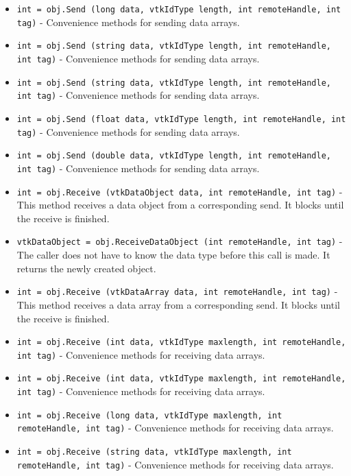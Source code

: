 \begin{itemize}
\item  \verb|int = obj.Send (long data, vtkIdType length, int remoteHandle, int tag)| -  Convenience methods for sending data arrays.

\item  \verb|int = obj.Send (string data, vtkIdType length, int remoteHandle, int tag)| -  Convenience methods for sending data arrays.

\item  \verb|int = obj.Send (string data, vtkIdType length, int remoteHandle, int tag)| -  Convenience methods for sending data arrays.

\item  \verb|int = obj.Send (float data, vtkIdType length, int remoteHandle, int tag)| -  Convenience methods for sending data arrays.

\item  \verb|int = obj.Send (double data, vtkIdType length, int remoteHandle, int tag)| -  Convenience methods for sending data arrays.

\item  \verb|int = obj.Receive (vtkDataObject data, int remoteHandle, int tag)| -  This method receives a data object from a corresponding send. It blocks
 until the receive is finished.

\item  \verb|vtkDataObject = obj.ReceiveDataObject (int remoteHandle, int tag)| -  The caller does not have to know the data type before this call is made.
 It returns the newly created object.

\item  \verb|int = obj.Receive (vtkDataArray data, int remoteHandle, int tag)| -  This method receives a data array from a corresponding send. It blocks
 until the receive is finished.

\item  \verb|int = obj.Receive (int data, vtkIdType maxlength, int remoteHandle, int tag)| -  Convenience methods for receiving data arrays.

\item  \verb|int = obj.Receive (int data, vtkIdType maxlength, int remoteHandle, int tag)| -  Convenience methods for receiving data arrays.

\item  \verb|int = obj.Receive (long data, vtkIdType maxlength, int remoteHandle, int tag)| -  Convenience methods for receiving data arrays.

\item  \verb|int = obj.Receive (string data, vtkIdType maxlength, int remoteHandle, int tag)| -  Convenience methods for receiving data arrays.


\end{itemize}
